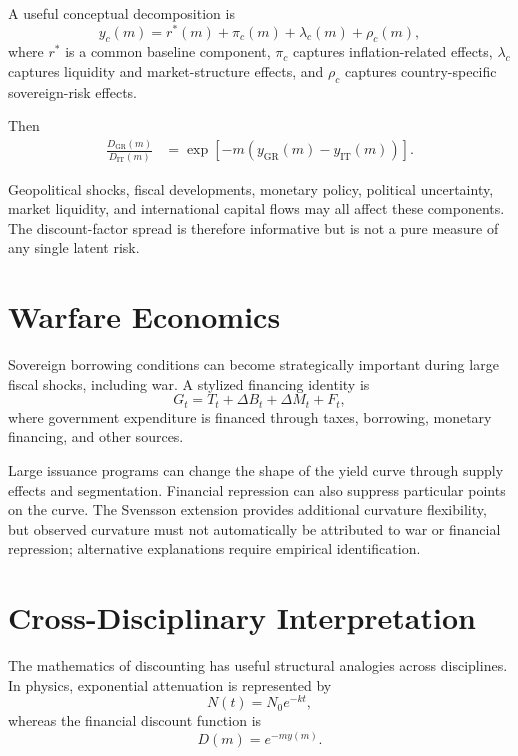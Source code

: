 \documentclass[a4paper,10pt]{article}
\theoremstyle{remark}
\begin{document}
A useful conceptual decomposition is
\begin{equation}
y_c(m)=r^*(m)+\pi_c(m)+\lambda_c(m)+\rho_c(m),
\end{equation}
where $r^*$ is a common baseline component, $\pi_c$ captures inflation-related effects, $\lambda_c$ captures liquidity and market-structure effects, and $\rho_c$ captures country-specific sovereign-risk effects.

Then
\begin{align}
\frac{D_{\mathrm{GR}}(m)}{D_{\mathrm{IT}}(m)}
&=\exp\left[-m\left(y_{\mathrm{GR}}(m)-y_{\mathrm{IT}}(m)\right)\right].
\end{align}

Geopolitical shocks, fiscal developments, monetary policy, political uncertainty, market liquidity, and international capital flows may all affect these components. The discount-factor spread is therefore informative but is not a pure measure of any single latent risk.

\section{Warfare Economics}

Sovereign borrowing conditions can become strategically important during large fiscal shocks, including war. A stylized financing identity is
\begin{equation}
G_t=T_t+\Delta B_t+\Delta M_t+F_t,
\end{equation}
where government expenditure is financed through taxes, borrowing, monetary financing, and other sources.

Large issuance programs can change the shape of the yield curve through supply effects and segmentation. Financial repression can also suppress particular points on the curve. The Svensson extension provides additional curvature flexibility, but observed curvature must not automatically be attributed to war or financial repression; alternative explanations require empirical identification.

\section{Cross-Disciplinary Interpretation}

The mathematics of discounting has useful structural analogies across disciplines. In physics, exponential attenuation is represented by
\begin{equation}
N(t)=N_0e^{-kt},
\end{equation}
whereas the financial discount function is
\begin{equation}
D(m)=e^{-m y(m)}.
\end{equation}
\end{document}
